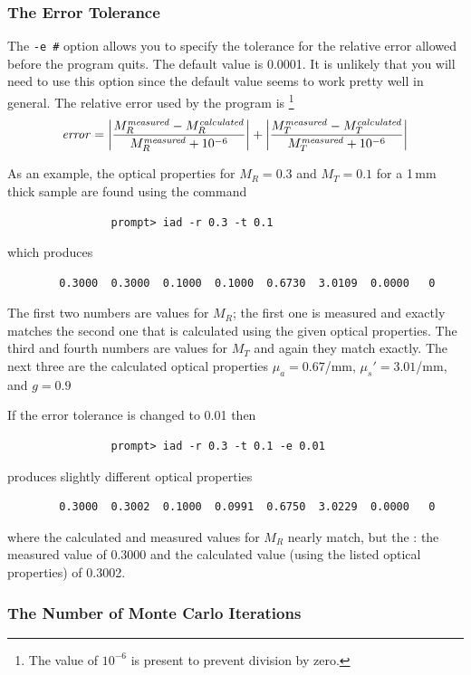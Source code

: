 \documentclass{article}
\begin{document}
\subsubsection{The Error Tolerance }
\label{error}
The \texttt{-e \#} option allows you to specify the tolerance for the relative error allowed
before the program quits.  The default value is 0.0001. It is unlikely that you will need to
use this option since the default value seems to work pretty well in general.
The relative error used by the program is%
\footnote{The value of $10^{-6}$ is present to prevent division by zero.} 
$$
\mathit{error} = \left| {M_R^\mathit{measured}-M_R^\mathit{calculated} \over M_R^\mathit{measured} + 10^{-6}} \right|
               + \left| {M_T^\mathit{measured}-M_T^\mathit{calculated} \over M_T^\mathit{measured} + 10^{-6}} \right|
$$

As an example, the optical properties for $M_R=0.3$ and $M_T=0.1$ for a 1\,mm thick sample
are found using the command
\begin{verbatim}
                prompt> iad -r 0.3 -t 0.1
\end{verbatim}
which produces
\begin{verbatim}
        0.3000  0.3000  0.1000  0.1000  0.6730  3.0109  0.0000   0
\end{verbatim}
The first two numbers
are values for $M_R$; the first one is measured and exactly matches the
second one that is calculated using the given optical properties.  The third
and fourth numbers are values for $M_T$ and again they match exactly.  The next
three are the calculated optical properties 
$\mu_a=0.67$/mm, $\mu_s'=3.01$/mm, and $g=0.9$

If the
error tolerance is changed to 0.01 then
\begin{verbatim}
                prompt> iad -r 0.3 -t 0.1 -e 0.01
\end{verbatim}
produces slightly different optical properties
\begin{verbatim}
        0.3000  0.3002  0.1000  0.0991  0.6750  3.0229  0.0000   0
\end{verbatim}
where the calculated and measured values for $M_R$ nearly match, but the
: the measured value of
0.3000 and the calculated value (using the listed optical properties) of
0.3002.  

\subsubsection{The Number of Monte Carlo Iterations}
\end{document}
